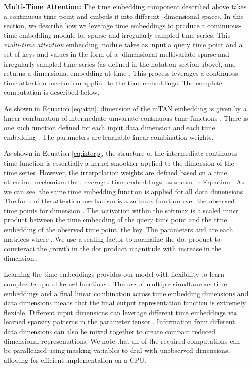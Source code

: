 \documentclass{article} \usepackage{iclr2021_conference,times}
\begin{document}
\textbf{Multi-Time Attention:}
\label{sec:tan}
The time embedding component described above takes a continuous time point and embeds it into  different -dimensional spaces. In this section, we describe how we leverage time embeddings to produce a continuous-time embedding module for sparse and irregularly sampled time series. This \textit{multi-time attention} embedding module  takes as input a query time point  and a set of keys and values in the form of a -dimensional multivariate sparse and irregularly sampled time series  (as defined in the notation section above), and returns a  dimensional embedding at time . This process leverages a continuous-time attention mechanism applied to the  time embeddings. The complete computation is described below.
\allowdisplaybreaks


As shown in Equation \ref{eq:attn}, dimension  of the mTAN embedding  is given by a linear combination of intermediate univariate continuous-time functions . There is one such function defined for each input data dimension  and each time embedding . The parameters  are learnable linear combination weights.


As shown in Equation \ref{eq:interp}, the structure of the intermediate continuous-time function  is essentially a kernel smoother applied to the  dimension of the time series. However, the interpolation weights  are defined based on a time attention mechanism that leverages time embeddings, as shown in Equation . As we can see, the same time embedding function  is applied for all data dimensions. The form of the attention mechanism is a softmax function over the observed time points  for dimension . The activation within the softmax is a scaled inner product between the time embedding  of the query time point  and the time embedding  of the observed time point, the key. The parameters  and  are each  matrices where . We use a scaling factor  to normalize the dot product to counteract the growth in the dot product magnitude with increase in the dimension . 

Learning the time embeddings provides our model with flexibility to learn complex temporal kernel functions . The use of multiple simultaneous time embeddings  and a final linear combination across time embedding dimensions and data dimensions means that the final output representation function  is extremely flexible. Different input dimensions can leverage different time embeddings via learned sparsity patterns in the parameter tensor . Information from different data dimensions can also be mixed together to create compact reduced dimensional representations. We note that all of the required computations can be parallelized using masking variables to deal with unobserved dimensions, allowing for efficient implementation on a GPU.
\end{document}

